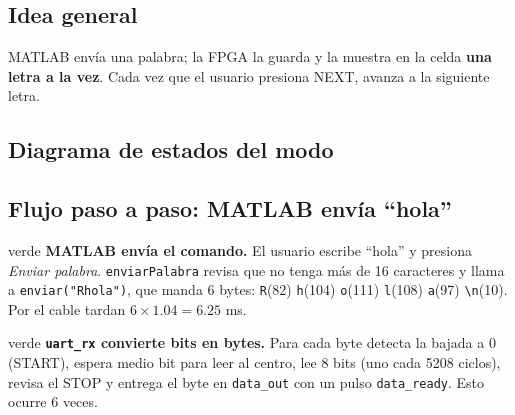 \documentclass[11pt,a4paper]{article}
\newcommand{\cod}[1]{\texttt{#1}}
\begin{document}
\subsection{Idea general}
MATLAB envía una palabra; la FPGA la guarda y la muestra en la celda \textbf{una
letra a la vez}. Cada vez que el usuario presiona NEXT, avanza a la siguiente letra.

\subsection{Diagrama de estados del modo}
\begin{center}
\end{center}

\subsection{Flujo paso a paso: MATLAB envía ``hola''}

\begin{paso}{verde}
\textbf{MATLAB envía el comando.} El usuario escribe ``hola'' y presiona
\emph{Enviar palabra}. \cod{enviarPalabra} revisa que no tenga más de 16 caracteres
y llama a \cod{enviar("Rhola")}, que manda 6 bytes:
\cod{R}(82) \cod{h}(104) \cod{o}(111) \cod{l}(108) \cod{a}(97) \cod{\textbackslash n}(10).
Por el cable tardan $6 \times 1.04 = 6.25$ ms.
\end{paso}

\begin{paso}{verde}
\textbf{\cod{uart\_rx} convierte bits en bytes.} Para cada byte detecta la
bajada a 0 (START), espera medio bit para leer al centro, lee 8 bits (uno cada 5208
ciclos), revisa el STOP y entrega el byte en \cod{data\_out} con un pulso
\cod{data\_ready}. Esto ocurre 6 veces.
\end{paso}
\end{document}
